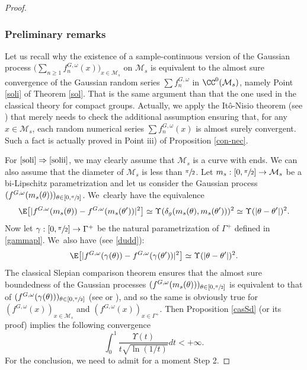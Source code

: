 \skpt
\begin{proof}\vspace*{-.5\baselineskip}
\subsubsection*{Preliminary remarks}
Let us recall why the existence of a sample-continuous version of the Gaussian process $\bigl(\sum_{n\geq 1}f_n^{G,\omega}(x)\bigr)_{x\in \mathcal{M}_s}$ on $\mathcal{M}_s$ is equivalent to the almost sure convergence of the Gaussian random series $\sum f_n^{G,\omega}$ in $\CC^0(\mathcal{M}_s)$, namely Point \eqref{soli} of Theorem \ref{sol}. That is the same argument than that the one used in the classical theory for compact groups. Actually, we apply the Itô-Nisio theorem (see \cite[p.\,238]{queff2}) that merely needs to check the additional assumption ensuring that, for any $x\in \mathcal{M}_s$, each random numerical series $\sum f_n^{G,\omega}(x)$ is almost surely convergent. Such a fact is actually proved in Point iii) of Proposition \ref{con-nec}.

 For $\eqref{soli}\Rightarrow\eqref{solii}$, we may clearly assume that $\mathcal{M}_s$ is a curve with ends. We can also assume that the diameter of $\mathcal{M}_s$ is less than $\sfrac{\pi}{2}$. Let $m_s: [0,\sfrac{\pi}{2}]\to \mathcal{M}_s$ be a bi-Lipschitz parametrization and let us consider the Gaussian process $(f^{G,\omega}(m_s(\theta)))_{\theta \in [0,\sfrac{\pi}{2}]}$. We~clearly have the equivalence
\begin{equation*}
\E\bigl[|f^{G,\omega}(m_s(\theta))-f^{G,\omega}(m_s(\theta'))|^2\bigr]\simeq \Upsilon(\delta_g(m_s(\theta),m_s(\theta')))^2\simeq \Upsilon(|\theta-\theta'|)^2.
\end{equation*}
Now let $\gamma:[0,\sfrac{\pi}{2}]\to \Gamma^{+}$ be the natural parametrization of $\Gamma^{+}$ defined in \eqref{gammapl}. We~also have (see \eqref{dudd}):
\begin{equation}\label{defSS}
\E\bigl[|f^{G,\omega}(\gamma(\theta))-f^{G,\omega}(\gamma(\theta'))|^2\bigr]\simeq \Upsilon(|\theta-\theta'|)^2.
\end{equation}
The classical Slepian comparison theorem ensures that the almost sure boundedness of the Gaussian processes $(f^{G,\omega}(m_s(\theta)))_{\theta \in [0,\sfrac{\pi}{2}]}$ is equivalent to that of
$(f^{G,\omega}(\gamma(\theta)))_{\theta\in [0,\sfrac{\pi}{2}]}$ (see \cite[Cor.\,3.14]{ledoux} or \cite[p.\,73]{queff2}), and so the same is obviously true for $(f^{G,\omega}(x))_{x\in \mathcal{M}_s}$ and $(f^{G,\omega}(x))_{x\in \Gamma^+}$. Then Proposition \ref{casSd} (or its proof) implies the following convergence
\begin{equation}\label{uup}
\int_{0}^1 \frac{\Upsilon(t)}{t\sqrt{\ln(1/t)}}dt <+\infty.
\end{equation}
For the conclusion, we need to admit for a moment Step 2.


\end{proof}
